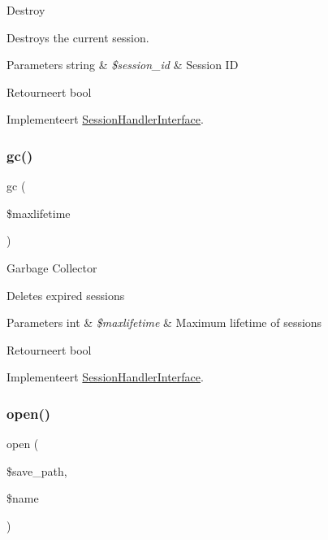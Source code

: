 Destroy

Destroys the current session.


\begin{DoxyParams}[1]{Parameters}
string & {\em \$session\+\_\+id} & Session ID \\
\hline
\end{DoxyParams}
\begin{DoxyReturn}{Retourneert}
bool 
\end{DoxyReturn}


Implementeert \mbox{\hyperlink{interface_session_handler_interface}{Session\+Handler\+Interface}}.

\mbox{\label{class_c_i___session__redis__driver_a57aff7ee0656d8aa75d545fb8b3ae35d}} 
\subsubsection{\texorpdfstring{gc()}{gc()}}
{\footnotesize\ttfamily gc (\begin{DoxyParamCaption}\item[{}]{\$maxlifetime }\end{DoxyParamCaption})}

Garbage Collector

Deletes expired sessions


\begin{DoxyParams}[1]{Parameters}
int & {\em \$maxlifetime} & Maximum lifetime of sessions \\
\hline
\end{DoxyParams}
\begin{DoxyReturn}{Retourneert}
bool 
\end{DoxyReturn}


Implementeert \mbox{\hyperlink{interface_session_handler_interface}{Session\+Handler\+Interface}}.

\mbox{\label{class_c_i___session__redis__driver_a614b5cf3840833913c7a73260ed28e02}} 
\subsubsection{\texorpdfstring{open()}{open()}}
{\footnotesize\ttfamily open (\begin{DoxyParamCaption}\item[{}]{\$save\+\_\+path,  }\item[{}]{\$name }\end{DoxyParamCaption})}


